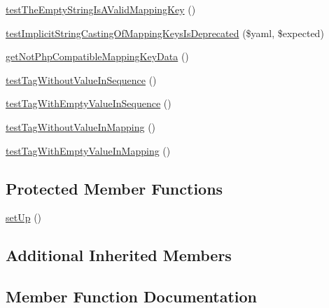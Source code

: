 \begin{DoxyCompactItemize}
\item 
\mbox{\hyperlink{class_symfony_1_1_component_1_1_yaml_1_1_tests_1_1_inline_test_a08d013e77eb75b76e41384c984cba2ba}{test\+The\+Empty\+String\+Is\+A\+Valid\+Mapping\+Key}} ()
\item 
\mbox{\hyperlink{class_symfony_1_1_component_1_1_yaml_1_1_tests_1_1_inline_test_ac5a75e42dd9d9ed4dec99fef30c5b8a3}{test\+Implicit\+String\+Casting\+Of\+Mapping\+Keys\+Is\+Deprecated}} (\$yaml, \$expected)
\item 
\mbox{\hyperlink{class_symfony_1_1_component_1_1_yaml_1_1_tests_1_1_inline_test_a5816bf60dcc83d1e1f0878e4ed63cf09}{get\+Not\+Php\+Compatible\+Mapping\+Key\+Data}} ()
\item 
\mbox{\hyperlink{class_symfony_1_1_component_1_1_yaml_1_1_tests_1_1_inline_test_ae64deaa1967a55e61602697412a5c918}{test\+Tag\+Without\+Value\+In\+Sequence}} ()
\item 
\mbox{\hyperlink{class_symfony_1_1_component_1_1_yaml_1_1_tests_1_1_inline_test_afa4672b5f96d8cbf4ac781a51ac800f7}{test\+Tag\+With\+Empty\+Value\+In\+Sequence}} ()
\item 
\mbox{\hyperlink{class_symfony_1_1_component_1_1_yaml_1_1_tests_1_1_inline_test_ae275cc5211e64fc92ea21cf709f49016}{test\+Tag\+Without\+Value\+In\+Mapping}} ()
\item 
\mbox{\hyperlink{class_symfony_1_1_component_1_1_yaml_1_1_tests_1_1_inline_test_a3775d0492bbac1c85d3bed7cc6de5e9e}{test\+Tag\+With\+Empty\+Value\+In\+Mapping}} ()
\end{DoxyCompactItemize}
\subsection*{Protected Member Functions}
\begin{DoxyCompactItemize}
\item 
\mbox{\hyperlink{class_symfony_1_1_component_1_1_yaml_1_1_tests_1_1_inline_test_a0bc688732d2b3b162ffebaf7812e78da}{set\+Up}} ()
\end{DoxyCompactItemize}
\subsection*{Additional Inherited Members}


\subsection{Member Function Documentation}
\mbox{\label{class_symfony_1_1_component_1_1_yaml_1_1_tests_1_1_inline_test_afb7f946c9c44d742389e7519763dd22e}} 
